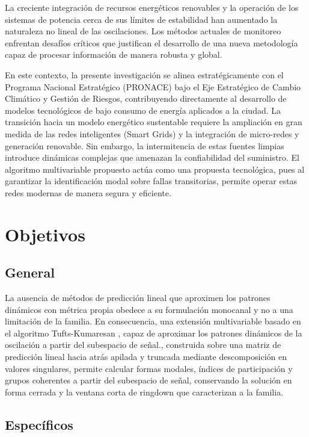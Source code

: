 La creciente integración de recursos energéticos renovables y la operación de los sistemas de potencia 
cerca de sus límites de estabilidad han aumentado la naturaleza no lineal de las oscilaciones. Los 
métodos actuales de monitoreo enfrentan desafíos críticos que justifican el desarrollo de una nueva 
metodología capaz de procesar información de manera robusta y global.

En este contexto, la presente investigación se alinea estratégicamente con el Programa Nacional 
Estratégico (PRONACE) bajo el Eje Estratégico de Cambio Climático y Gestión de Riesgos, contribuyendo 
directamente al desarrollo de modelos tecnológicos de bajo consumo de energía aplicados a la ciudad. La 
transición hacia un modelo energético sustentable requiere la ampliación en gran medida de las redes 
inteligentes (Smart Grids) y la integración de micro-redes y generación renovable. Sin embargo, la 
intermitencia de estas fuentes limpias introduce dinámicas complejas que amenazan la confiabilidad del 
suministro. El algoritmo multivariable propuesto actúa como una propuesta tecnológica, pues al 
garantizar la identificación modal sobre fallas transitorias, permite operar estas redes modernas de manera 
segura y eficiente.

\section{Objetivos}

\subsection{General}

La ausencia de métodos de predicción lineal que aproximen los patrones dinámicos con métrica propia obedece a su 
formulación monocanal y no a una limitación de la familia. En consecuencia, una extensión multivariable basado en 
el algoritmo Tufts-Kumaresan \cite{Tufts1982,Moghdam2024}, capaz de aproximar los patrones dinámicos de la oscilación 
a partir del subespacio de señal., construida sobre una matriz de predicción lineal hacia atrás apilada y truncada 
mediante descomposición en valores singulares, permite calcular formas modales, índices de participación y grupos 
coherentes a partir del subespacio de señal, conservando la solución en forma cerrada y la ventana corta de ringdown 
que caracterizan a la familia.

\subsection{Específicos}

